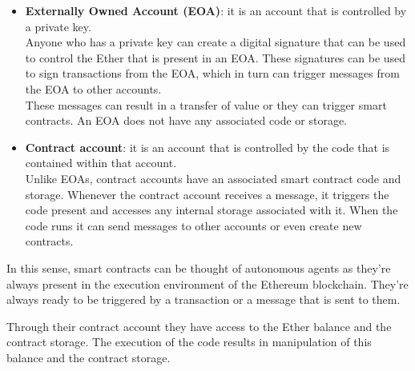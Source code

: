 \begin{itemize}
\item
  \textbf{Externally Owned Account (EOA)}: it is an account that is
  controlled by a private key.\\

  Anyone who has a private key can create a digital signature that can
  be used to control the Ether that is present in an EOA. These
  signatures can be used to sign transactions from the EOA, which in
  turn can trigger messages from the EOA to other accounts.\\

  These messages can result in a transfer of value or they can trigger
  smart contracts. An EOA does not have any associated code or storage.
\item
  \textbf{Contract account}: it is an account that is controlled by the
  code that is contained within that account.\\

  Unlike EOAs, contract accounts have an associated smart contract code
  and storage. Whenever the contract account receives a message, it
  triggers the code present and accesses any internal storage associated
  with it. When the code runs it can send messages to other accounts or
  even create new contracts.
\end{itemize}

In this sense, smart contracts can be thought of autonomous agents as
they're always present in the execution environment of the Ethereum
blockchain. They're always ready to be triggered by a transaction or a
message that is sent to them.

Through their contract account they have access to the Ether balance and
the contract storage. The execution of the code results in manipulation
of this balance and the contract storage.
